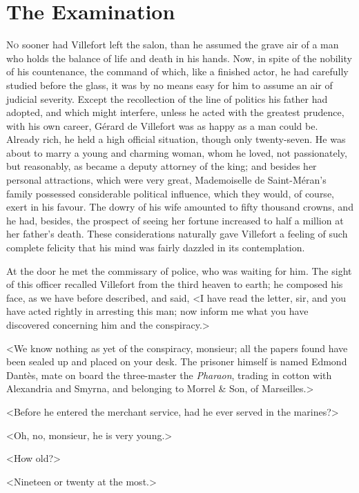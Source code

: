 \chapter{The Examination} 

 \lettrine{N}{o} sooner had Villefort left the salon, than he assumed the grave air of a man who holds the balance of life and death in his hands. Now, in spite of the nobility of his countenance, the command of which, like a finished actor, he had carefully studied before the glass, it was by no means easy for him to assume an air of judicial severity. Except the recollection of the line of politics his father had adopted, and which might interfere, unless he acted with the greatest prudence, with his own career, Gérard de Villefort was as happy as a man could be. Already rich, he held a high official situation, though only twenty-seven. He was about to marry a young and charming woman, whom he loved, not passionately, but reasonably, as became a deputy attorney of the king; and besides her personal attractions, which were very great, Mademoiselle de Saint-Méran's family possessed considerable political influence, which they would, of course, exert in his favour. The dowry of his wife amounted to fifty thousand crowns, and he had, besides, the prospect of seeing her fortune increased to half a million at her father's death. These considerations naturally gave Villefort a feeling of such complete felicity that his mind was fairly dazzled in its contemplation. 

 At the door he met the commissary of police, who was waiting for him. The sight of this officer recalled Villefort from the third heaven to earth; he composed his face, as we have before described, and said, <I have read the letter, sir, and you have acted rightly in arresting this man; now inform me what you have discovered concerning him and the conspiracy.> 

 <We know nothing as yet of the conspiracy, monsieur; all the papers found have been sealed up and placed on your desk. The prisoner himself is named Edmond Dantès, mate on board the three-master the \textit{Pharaon}, trading in cotton with Alexandria and Smyrna, and belonging to Morrel \& Son, of Marseilles.> 

 <Before he entered the merchant service, had he ever served in the marines?> 

 <Oh, no, monsieur, he is very young.> 

 <How old?> 

 <Nineteen or twenty at the most.> 

